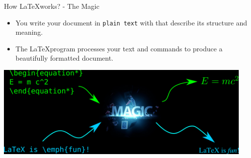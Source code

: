 \documentclass[10pt,times]{beamer}
\begin{document}
\begin{frame}{How \LaTeX works? - The Magic}
\begin{itemize}
\item You write your document in \texttt{plain text} with  that
describe its structure and meaning.
\item The \LaTeX program processes your text and commands to produce a
beautifully formatted document.
\end{itemize}

\centering
\includegraphics[width=0.95\textwidth]{figs/magic.png}
\end{frame}


\end{document}
